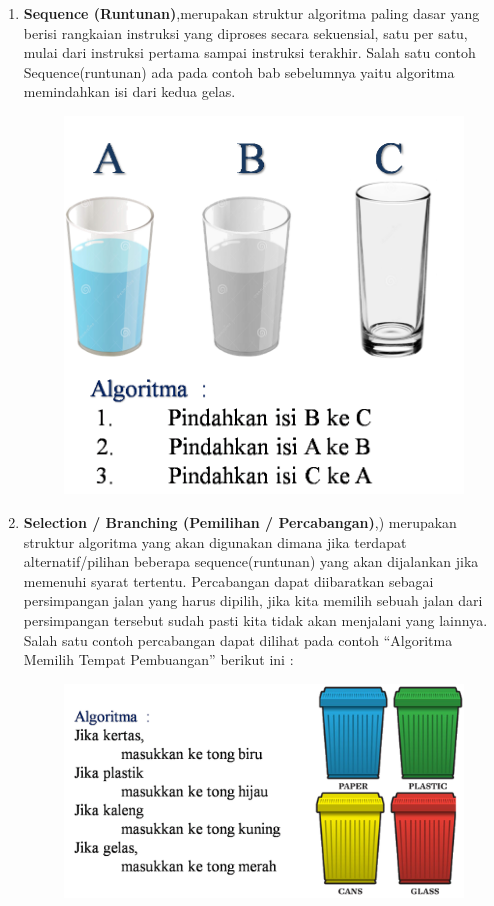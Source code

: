 \begin{enumerate}
	\item \textbf{Sequence  (Runtunan)},merupakan struktur algoritma paling dasar yang berisi rangkaian instruksi yang diproses secara sekuensial, satu per satu, mulai dari instruksi pertama sampai instruksi terakhir. Salah satu contoh Sequence(runtunan) ada pada contoh bab sebelumnya yaitu algoritma memindahkan isi dari kedua gelas. 
	\begin{figure}
	\centering
	\includegraphics[scale=0.4]{fig/1/Gambar13.png}	
	\end{figure}
	
	\item \textbf{Selection / Branching (Pemilihan / Percabangan)},) merupakan struktur algoritma yang akan digunakan dimana jika terdapat alternatif/pilihan beberapa sequence(runtunan) yang akan dijalankan jika memenuhi syarat tertentu. Percabangan dapat diibaratkan sebagai persimpangan jalan yang harus dipilih, jika kita memilih sebuah jalan dari persimpangan tersebut sudah pasti kita tidak akan menjalani yang lainnya. Salah satu contoh percabangan dapat dilihat pada contoh “Algoritma Memilih Tempat Pembuangan” berikut ini :  
		\begin{figure}
		\centering
		\includegraphics[scale=0.4]{fig/1/Gambar14.png}	
		\end{figure}
		

\end{enumerate}
